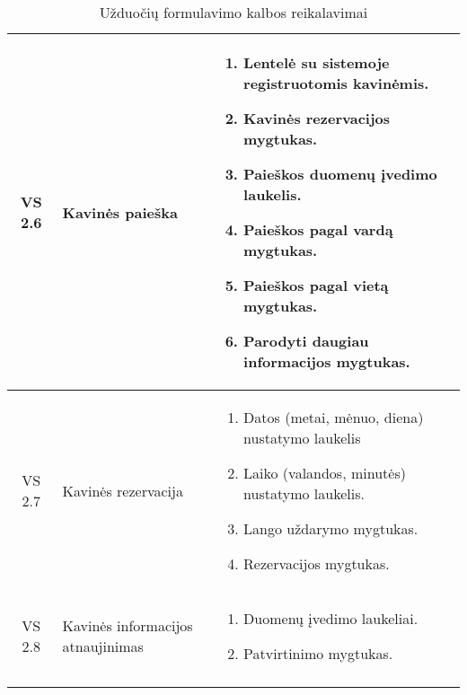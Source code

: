\documentclass{VUMIFPSkursinis}
\begin{document}
\begin{center}
\begin{longtable}{|p{2cm}|p{}|p{}|}
	\hline	
		\multicolumn{1}{|c|}{VS 2.6}&
		{Kavinės paieška}&
		\multicolumn{1}{|p{10,2cm}|}{
			\begin{enumerate}
				\item Lentelė su sistemoje registruotomis kavinėmis.
				\item Kavinės rezervacijos mygtukas.
				\item Paieškos duomenų įvedimo laukelis.
				\item Paieškos pagal vardą mygtukas.
				\item Paieškos pagal vietą mygtukas.
				\item Parodyti daugiau informacijos mygtukas.
			\end{enumerate}}\\
	
	\hline 	
		\multicolumn{1}{|c|}{VS 2.7}&
		{Kavinės rezervacija}&
		\multicolumn{1}{|p{10,2cm}|}{
			\begin{enumerate}
				\item Datos (metai, mėnuo, diena) nustatymo laukelis
				\item Laiko (valandos, minutės) nustatymo laukelis.
				\item Lango uždarymo mygtukas.
				\item Rezervacijos mygtukas.
			\end{enumerate}}\\
	
	\hline
		\multicolumn{1}{|c|}{VS 2.8}& 	
		{Kavinės informacijos atnaujinimas}&
		\multicolumn{1}{|p{8,6cm}|}{
			\begin{enumerate}
				\item Duomenų įvedimo laukeliai.
				\item Patvirtinimo mygtukas.
			\end{enumerate}}\\
	
	\hline
	\caption{Užduočių formulavimo kalbos reikalavimai}
	\label{table:3}	
	\end{longtable}

\end{center}
\end{document}
